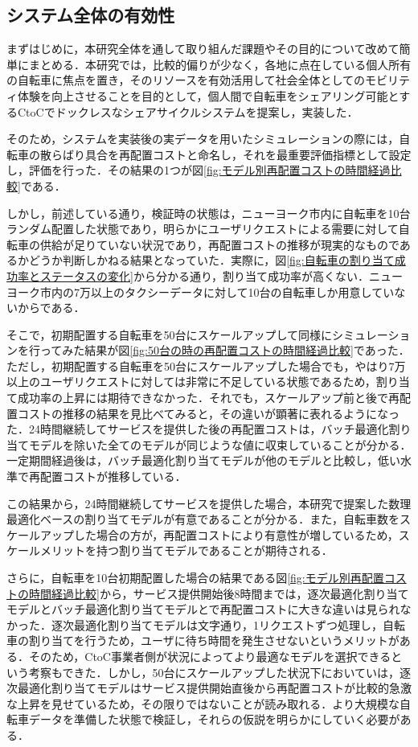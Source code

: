   \subsection{システム全体の有効性}
    \label{sec:システム全体の有効性}
      \par まずはじめに，本研究全体を通して取り組んだ課題やその目的について改めて簡単にまとめる．本研究では，比較的偏りが少なく，各地に点在している個人所有の自転車に焦点を置き，そのリソースを有効活用して社会全体としてのモビリティ体験を向上させることを目的として，個人間で自転車をシェアリング可能とするCtoCでドックレスなシェアサイクルシステムを提案し，実装した．
      \par そのため，システムを実装後の実データを用いたシミュレーションの際には，自転車の散らばり具合を再配置コストと命名し，それを最重要評価指標として設定し，評価を行った．その結果の1つが図\ref{fig:モデル別再配置コストの時間経過比較}である．
      \par しかし，前述している通り，検証時の状態は，ニューヨーク市内に自転車を10台ランダム配置した状態であり，明らかにユーザリクエストによる需要に対して自転車の供給が足りていない状況であり，再配置コストの推移が現実的なものであるかどうか判断しかねる結果となっていた．実際に，図\ref{fig:自転車の割り当て成功率とステータスの変化}から分かる通り，割り当て成功率が高くない．ニューヨーク市内の7万以上のタクシーデータに対して10台の自転車しか用意していないからである．
      \par そこで，初期配置する自転車を50台にスケールアップして同様にシミュレーションを行ってみた結果が図\ref{fig:50台の時の再配置コストの時間経過比較}であった．ただし，初期配置する自転車を50台にスケールアップした場合でも，やはり7万以上のユーザリクエストに対しては非常に不足している状態であるため，割り当て成功率の上昇には期待できなかった．それでも，スケールアップ前と後で再配置コストの推移の結果を見比べてみると，その違いが顕著に表れるようになった．24時間継続してサービスを提供した後の再配置コストは，バッチ最適化割り当てモデルを除いた全てのモデルが同じような値に収束していることが分かる．一定期間経過後は，バッチ最適化割り当てモデルが他のモデルと比較し，低い水準で再配置コストが推移している．
      \par この結果から，24時間継続してサービスを提供した場合，本研究で提案した数理最適化ベースの割り当てモデルが有意であることが分かる．また，自転車数をスケールアップした場合の方が，再配置コストにより有意性が増しているため，スケールメリットを持つ割り当てモデルであることが期待される．
      \par さらに，自転車を10台初期配置した場合の結果である図\ref{fig:モデル別再配置コストの時間経過比較}から，サービス提供開始後8時間までは，逐次最適化割り当てモデルとバッチ最適化割り当てモデルとで再配置コストに大きな違いは見られなかった．逐次最適化割り当てモデルは文字通り，1リクエストずつ処理し，自転車の割り当てを行うため，ユーザに待ち時間を発生させないというメリットがある．そのため，CtoC事業者側が状況によってより最適なモデルを選択できるという考察もできた．しかし，50台にスケールアップした状況下においていは，逐次最適化割り当てモデルはサービス提供開始直後から再配置コストが比較的急激な上昇を見せているため，その限りではないことが読み取れる．より大規模な自転車データを準備した状態で検証し，それらの仮説を明らかにしていく必要がある．
